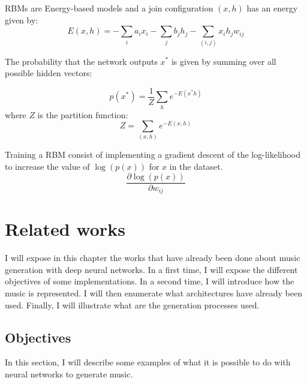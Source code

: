 \documentclass[12pt]{report}
\begin{document}
RBMs are Energy-based models and a join configuration $(x, h)$ has an energy given by:
\begin{equation}
    E(x, h) = -\sum_i a_i x_i - \sum_j b_j h_j - \sum_{(i, j)} x_i h_j w_{ij}
\end{equation}

The probability that the network outputs $x^{*}$ is given by summing over all possible hidden vectors:

\begin{equation}
    p(x^{*}) = \frac{1}{Z} \sum_h e^{- E(x^{*} h)}
\end{equation}
where $Z$ is the partition function:
\begin{equation}
    Z = \sum_{(x,h)} e^{- E(x, h)}
\end{equation}

Training a RBM consist of implementing a gradient descent of the log-likelihood to increase the value of $\log(p(x))$ for $x$ in the dataset.
\begin{equation*}
    \frac{\partial \log(p(x))}{\partial w_{ij}}
\end{equation*}




\chapter{Related works}

I will expose in this chapter the works that have already been done about music generation with deep neural networks.
In a first time, I will expose the different objectives of some implementations.
In a second time, I will introduce how the music is represented.
I will then enumerate what architectures have already been used. 
Finally, I will illustrate what are the generation processes used.


\section{Objectives}        %

In this section, I will describe some examples of what it is possible to do with neural networks to generate music.
\end{document}

